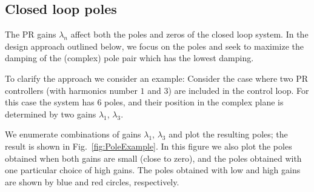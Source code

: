 \documentclass[conference,10pt]{IEEEtran}
\begin{document}
\subsection{Closed loop poles}
The PR gains $\lambda_n$ affect both the poles and zeros of the closed loop system. In the design approach outlined below, we focus on the poles and seek to maximize the damping of the (complex) pole pair which has the lowest damping.

To clarify the approach we consider an example: Consider the case where two PR controllers (with harmonics number $1$ and $3$) are included in the control loop. For this case the system has $6$ poles, and their position in the complex plane is determined by  two gains $\lambda_1$, $\lambda_3$.

We enumerate combinations of gains $\lambda_1$, $\lambda_3$ and plot the resulting poles; the result is shown in Fig.~\ref{fig:PoleExample}. In this figure we also plot the poles obtained when both gains are small (close to zero), and the poles obtained with one particular choice of high gains. The poles obtained with low and high gains are shown by blue and red circles, respectively.
\end{document}
